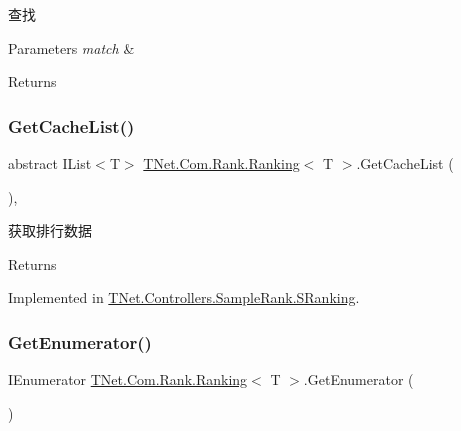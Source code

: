查找 


\begin{DoxyParams}{Parameters}
{\em match} & \\
\hline
\end{DoxyParams}
\begin{DoxyReturn}{Returns}

\end{DoxyReturn}
\mbox{\label{class_t_net_1_1_com_1_1_rank_1_1_ranking_ae0000a540fbbf11d5ca86eeff68423f3}} 
\subsubsection{\texorpdfstring{Get\+Cache\+List()}{GetCacheList()}}
{\footnotesize\ttfamily abstract I\+List$<$T$>$ \mbox{\hyperlink{class_t_net_1_1_com_1_1_rank_1_1_ranking}{T\+Net.\+Com.\+Rank.\+Ranking}}$<$ T $>$.Get\+Cache\+List (\begin{DoxyParamCaption}{ }\end{DoxyParamCaption})\hspace{0.3cm}{\ttfamily [protected]}, {}}



获取排行数据 

\begin{DoxyReturn}{Returns}

\end{DoxyReturn}


Implemented in \mbox{\hyperlink{class_t_net_1_1_controllers_1_1_sample_rank_1_1_s_ranking_a91a2f72ebdb7fef162dd51f25939e3db}{T\+Net.\+Controllers.\+Sample\+Rank.\+S\+Ranking}}.

\mbox{\label{class_t_net_1_1_com_1_1_rank_1_1_ranking_a0e273e472490b5168b2f4af14304c2ea}} 
\subsubsection{\texorpdfstring{Get\+Enumerator()}{GetEnumerator()}}
{\footnotesize\ttfamily I\+Enumerator \mbox{\hyperlink{class_t_net_1_1_com_1_1_rank_1_1_ranking}{T\+Net.\+Com.\+Rank.\+Ranking}}$<$ T $>$.Get\+Enumerator (\begin{DoxyParamCaption}{ }\end{DoxyParamCaption})}




